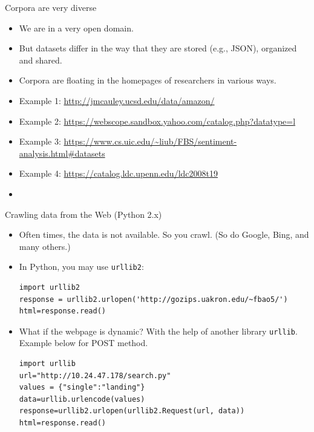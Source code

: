 \documentclass[11pt]{beamer}
\begin{document}
\begin{frame}{Corpora are very diverse}
 \begin{itemize}[<+->]
  \item We are in a very open domain. 
  \item But datasets differ in the way that they are stored (e.g., JSON), organized and shared. 
  \item Corpora are floating in the homepages of researchers in various ways. 
  \item Example 1: \url{http://jmcauley.ucsd.edu/data/amazon/}
  \item Example 2: \url{https://webscope.sandbox.yahoo.com/catalog.php?datatype=l}
  \item Example 3: \url{https://www.cs.uic.edu/~liub/FBS/sentiment-analysis.html\#datasets}
  \item Example 4: \url{https://catalog.ldc.upenn.edu/ldc2008t19}
  \item \color{red}{ Lots of subjectivity in annotated data. }
 \end{itemize}
\end{frame}


\begin{frame}[fragile]{Crawling data from the Web (Python 2.x)}
\begin{itemize}
 \item Often times, the data is not available. So you crawl. (So do Google, Bing, and many others.) 
 \item In Python, you may use \texttt{urllib2}: 
 
 {\small
 \begin{lstlisting}
import urllib2
response = urllib2.urlopen('http://gozips.uakron.edu/~fbao5/')
html=response.read()
 \end{lstlisting}
}
\item What if the webpage is dynamic? With the help of another library \texttt{urllib}. Example below for POST method. 
\begin{lstlisting}
import urllib
url="http://10.24.47.178/search.py"
values = {"single":"landing"}
data=urllib.urlencode(values)
response=urllib2.urlopen(urllib2.Request(url, data))
html=response.read()
\end{lstlisting}
\end{itemize}
\end{frame}
\end{document}
